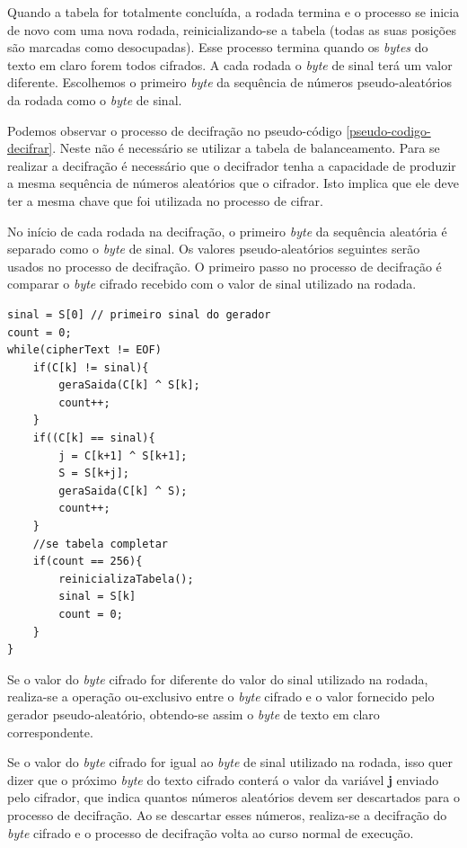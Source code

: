 Quando a tabela for totalmente concluída, a rodada termina e o processo se inicia de novo com uma nova rodada, reinicializando-se a tabela (todas as suas posições são marcadas como desocupadas). Esse processo termina quando os \textit{bytes} do texto em claro forem todos cifrados. A cada rodada o \textit{byte} de sinal terá um valor diferente. Escolhemos o primeiro \textit{byte} da sequência de números pseudo-aleatórios da rodada como o \textit{byte} de sinal.

Podemos observar o processo de decifração no pseudo-código \ref{pseudo-codigo-decifrar}. Neste não é necessário se utilizar a tabela de balanceamento. Para se realizar a decifração é necessário que o decifrador tenha a capacidade de produzir a mesma sequência de números aleatórios que o cifrador. Isto implica que ele deve ter a mesma chave que foi utilizada no processo de cifrar.

No início de cada rodada na decifração, o primeiro \textit{byte} da sequência aleatória é separado como o \textit{byte} de sinal. Os valores pseudo-aleatórios seguintes serão usados no processo de decifração. O primeiro passo no processo de decifração é comparar o \textit{byte} cifrado recebido com o valor de sinal utilizado na rodada. 



    \begin{lstlisting}[caption={Pseudo-Código Decifração}, label=pseudo-codigo-decifrar]
sinal = S[0] // primeiro sinal do gerador
count = 0;
while(cipherText != EOF)
	if(C[k] != sinal){
		geraSaida(C[k] ^ S[k];
		count++;
	}
	if((C[k] == sinal){
		j = C[k+1] ^ S[k+1];
		S = S[k+j];
		geraSaida(C[k] ^ S);
		count++;
	}
	//se tabela completar
	if(count == 256){
		reinicializaTabela();
		sinal = S[k]
		count = 0;
	}
}
    \end{lstlisting}

Se o valor do \textit{byte} cifrado for diferente do valor do sinal utilizado na rodada, realiza-se a operação ou-exclusivo entre o \textit{byte} cifrado e o valor fornecido pelo gerador pseudo-aleatório, obtendo-se assim o \textit{byte} de texto em claro correspondente.

Se o valor do \textit{byte} cifrado for igual ao \textit{byte} de sinal utilizado na rodada, isso quer dizer que o próximo \textit{byte} do texto cifrado conterá o valor da variável \textbf{j} enviado pelo cifrador, que indica quantos números aleatórios devem ser descartados para o processo de decifração. Ao se descartar esses números, realiza-se a decifração do \textit{byte} cifrado e o processo de decifração volta ao curso normal de execução.

